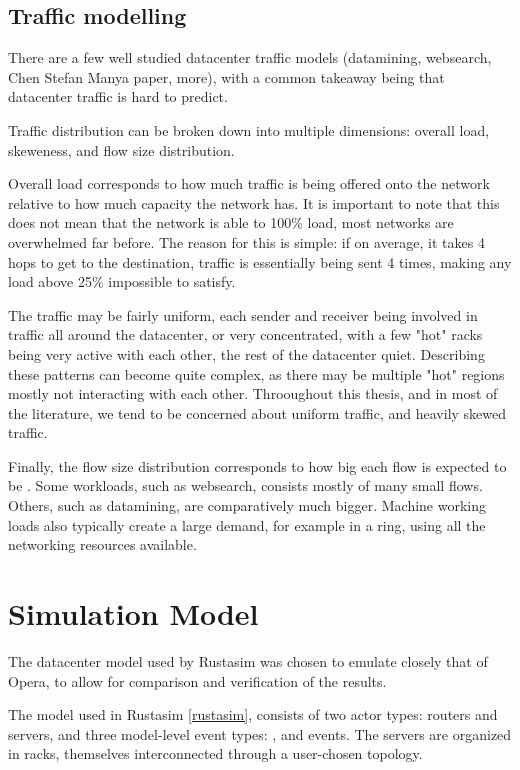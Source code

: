 \subsection{Traffic modelling} \label{model-traffic}

There are a few well studied datacenter traffic models (datamining, websearch, Chen Stefan Manya paper, more), with a common takeaway being that datacenter traffic is hard to predict.

Traffic distribution can be broken down into multiple dimensions: overall load, skeweness, and flow size distribution.


Overall load corresponds to how much traffic is being offered onto the network relative to how much capacity the network has.
It is important to note that this does not mean that the network is able to 100\% load, most networks are overwhelmed far before.
The reason for this is simple: if on average, it takes 4 hops to get to the destination, traffic is essentially being sent 4 times, making any load above 25\% impossible to satisfy.

The traffic may be fairly uniform, each sender and receiver being involved in traffic all around the datacenter, or very concentrated, with a few "hot" racks being very active with each other, the rest of the datacenter quiet.
Describing these patterns can become quite complex, as there may be multiple "hot" regions mostly not interacting with each other.
Throoughout this thesis, and in most of the literature, we tend to be concerned about uniform traffic, and heavily skewed traffic. %

Finally, the flow size distribution corresponds to how big each flow is expected to be \cite{alizadeh_data_2010}.
Some workloads, such as websearch, consists mostly of many small flows.
Others, such as datamining, are comparatively much bigger.
Machine working loads also typically create a large demand, for example in a ring, using all the networking resources available.

\section{Simulation Model} \label{model-sim}

The datacenter model used by Rustasim was chosen to emulate closely that of Opera, to allow for comparison and verification of the results.

The model used in Rustasim \ref{rustasim}, consists of two actor types: routers and servers, and three model-level event types: ,  and  events.
The servers are organized in racks, themselves interconnected through a user-chosen topology.

